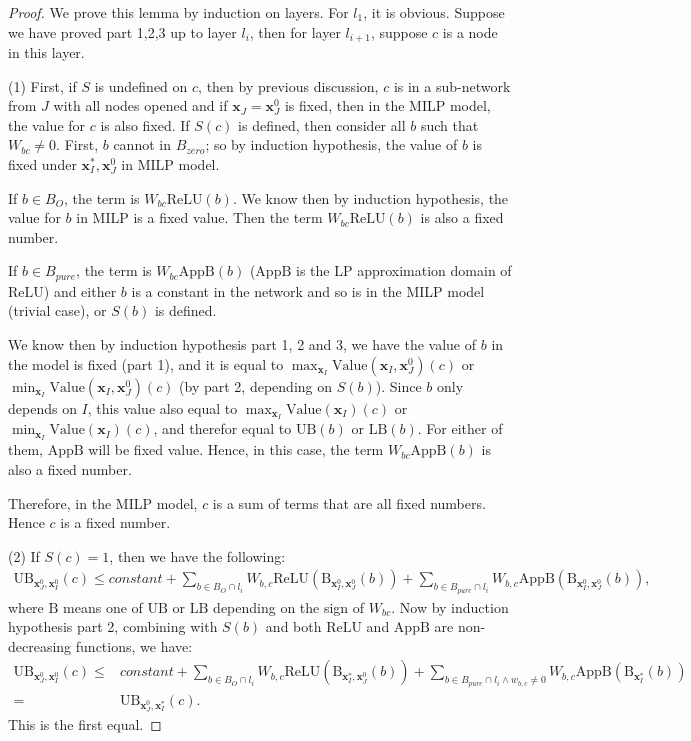 \documentclass[]{article}
\theoremstyle{definition}
\newcommand{\ReLU}{\mathrm{ReLU}}
\newcommand{\Val}{\mathrm{Value}}
\newcommand{\UB}{\mathrm{UB}}
\newcommand{\LB}{\mathrm{LB}}
\newcommand{\B}{\mathrm{B}}
\begin{document}
\begin{proof}
	We prove this lemma by induction on layers. For $l_1$, it is obvious. Suppose we have proved part 1,2,3 up to layer $l_i$, then for layer $l_{i+1}$, suppose $c$ is a node in this layer. 
	
(1)	First, if $S$ is undefined on $c$, then by previous discussion, $c$ is in a sub-network from $J$ with all nodes opened and if $\boldsymbol{x}_J=\boldsymbol{x}_J^0$ is fixed, then in the MILP model, the value for $c$ is also fixed. If $S(c)$ is defined, then consider all $b$ such that $W_{bc}\neq 0$. First, $b$ cannot in $B_{zero}$; so by induction hypothesis, the value of $b$ is fixed under $\boldsymbol{x}^*_I,\boldsymbol{x}^0_J$ in MILP model. 
	
	
	
	If $b\in B_O$, the term is $W_{bc}\ReLU(b)$. We know then by induction hypothesis, the value for $b$ in MILP is a fixed value. Then the term $W_{bc}\ReLU(b)$ is also a fixed number.  
	
	If $b\in B_{pure}$, the term is $W_{bc}\mathrm{AppB}(b)$ ($\mathrm{AppB}$ is the LP approximation domain of $\ReLU$) and either $b$ is a constant in the network and so is in the MILP model (trivial case), or $S(b)$ is defined. 
	
	We know then by induction hypothesis part 1, 2 and 3,  we have the value of $b$ in the model is fixed (part 1), and it is equal to $\max_{\boldsymbol{x}_I} \Val(\boldsymbol{x}_I,\boldsymbol{x}^0_J)(c)$ or $\min_{\boldsymbol{x}_I} \Val(\boldsymbol{x}_I,\boldsymbol{x}^0_J)(c)$ (by part 2, depending on $S(b)$). Since $b$ only depends on $I$, this value also equal to $\max_{\boldsymbol{x}_I} \Val(\boldsymbol{x}_I)(c)$ or $\min_{\boldsymbol{x}_I} \Val(\boldsymbol{x}_I)(c)$, and therefor equal to $\UB(b)$ or $\LB(b)$. For either of them, $\mathrm{AppB}$ will be fixed value. Hence, in this case, the term $W_{bc}\mathrm{AppB}(b)$ is also a fixed number.
	
	Therefore, in the MILP model, $c$ is a sum of terms that are all fixed numbers. Hence $c$ is a fixed number.
	
	(2) If $S(c)=1$, then we have the following:	\begin{align*}
		\mathrm{UB}_{\boldsymbol{x}^0_J,\boldsymbol{x}^0_I}(c) \leq constant + \sum_{b\in B_O\cap l_i} W_{b,c}\ReLU(\B_{\boldsymbol{x}^0_I,\boldsymbol{x}^0_J}(b)) + \sum_{b\in B_{pure}\cap l_{i}} W_{b,c} \mathrm{AppB}(\B_{\boldsymbol{x}^0_I,\boldsymbol{x}^0_J}(b)),
	\end{align*}where $\B$ means one of $\UB$ or $\LB$ depending on the sign of $W_{bc}$. Now by induction hypothesis part 2, combining with $S(b)$ and both $\ReLU$ and $\mathrm{AppB}$ are non-decreasing functions, we have:\begin{align*}
	\mathrm{UB}_{\boldsymbol{x}^0_J,\boldsymbol{x}^0_I}(c)\leq 
	&constant + \sum_{b\in B_O\cap l_i} W_{b,c}\ReLU(\B_{\boldsymbol{x}^*_I,\boldsymbol{x}^0_J}(b)) + \sum_{b\in B_{pure}\cap l_{i}\wedge w_{b,c}\neq 0} W_{b,c} \mathrm{AppB}(\B_{\boldsymbol{x}^*_I}(b))\\
	= & \mathrm{UB}_{\boldsymbol{x}^0_J,\boldsymbol{x}^*_I}(c). 
	\end{align*}  This is the first equal.
	

\end{proof}
\end{document}

